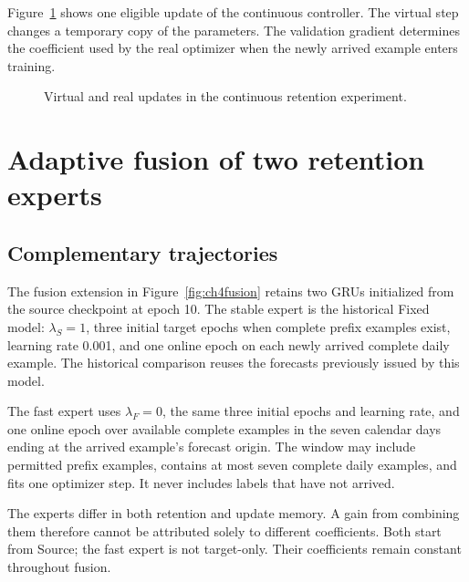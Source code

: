 Figure~\ref{fig:continuous-step} shows one eligible update of the continuous controller. The virtual step changes a temporary copy of the parameters. The validation gradient determines the coefficient used by the real optimizer when the newly arrived example enters training.
\begin{figure}[htbp]\centering
\resizebox{.95\linewidth}{!}{}
\caption{Virtual and real updates in the continuous retention experiment.}\label{fig:continuous-step}
\end{figure}

\section{Adaptive fusion of two retention experts}
\subsection{Complementary trajectories}


The fusion extension in Figure~\ref{fig:ch4fusion} retains two GRUs initialized from the source checkpoint at epoch 10. The stable expert is the historical Fixed model: $\lambda_S=1$, three initial target epochs when complete prefix examples exist, learning rate 0.001, and one online epoch on each newly arrived complete daily example. The historical comparison reuses the forecasts previously issued by this model.

The fast expert uses $\lambda_F=0$, the same three initial epochs and learning rate, and one online epoch over available complete examples in the seven calendar days ending at the arrived example's forecast origin. The window may include permitted prefix examples, contains at most seven complete daily examples, and fits one optimizer step. It never includes labels that have not arrived.

The experts differ in both retention and update memory. A gain from combining them therefore cannot be attributed solely to different coefficients. Both start from Source; the fast expert is not target-only. Their coefficients remain constant throughout fusion.

